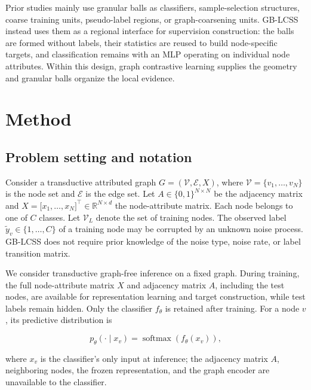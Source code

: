 \documentclass[10pt,letterpaper]{elsarticle}
\begin{document}
Prior studies mainly use granular balls as classifiers, sample-selection structures, coarse training units, pseudo-label regions, or graph-coarsening units. GB-LCSS instead uses them as a regional interface for supervision construction: the balls are formed without labels, their statistics are reused to build node-specific targets, and classification remains with an MLP operating on individual node attributes. Within this design, graph contrastive learning supplies the geometry and granular balls organize the local evidence.

\FloatBarrier

\section{Method}\label{sec:3}

\subsection{Problem setting and notation}\label{sec:3.1}

Consider a transductive attributed graph \(G = (\mathcal{V},\mathcal{E},X)\), where \(\mathcal{V} = \{ v_{1},\ldots,v_{N}\}\) is the node set and \(\mathcal{E}\) is the edge set. Let \(A \in \{ 0,1\}^{N \times N}\) be the adjacency matrix and \(X = \lbrack x_{1},\ldots,x_{N}\rbrack^{\top} \in \mathbb{R}^{N \times d}\) the node-attribute matrix. Each node belongs to one of \(C\) classes. Let \(\mathcal{V}_{L}\) denote the set of training nodes. The observed label \({\widetilde{y}}_{v} \in \{ 1,\ldots,C\}\) of a training node may be corrupted by an unknown noise process. GB-LCSS does not require prior knowledge of the noise type, noise rate, or label transition matrix.

We consider transductive graph-free inference on a fixed graph. During training, the full node-attribute matrix \(X\) and adjacency matrix \(A\), including the test nodes, are available for representation learning and target construction, while test labels remain hidden. Only the classifier \(f_{\theta}\) is retained after training. For a node \(v\), its predictive distribution is

\begin{equation}\label{eq:1}
p_{\theta}( \cdot \mid x_{v}) = \operatorname{softmax}\left( f_{\theta}(x_{v}) \right),
\end{equation}

where \(x_{v}\) is the classifier's only input at inference; the adjacency matrix \(A\), neighboring nodes, the frozen representation, and the graph encoder are unavailable to the classifier.
\end{document}
